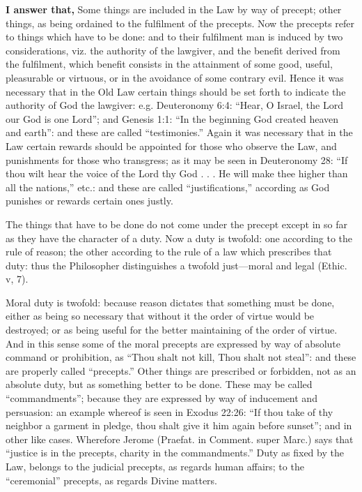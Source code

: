 \textbf{I answer that,} Some things are included in the Law by way of precept; other things, as being ordained to the fulfilment of the precepts. Now the precepts refer to things which have to be done: and to their fulfilment man is induced by two considerations, viz. the authority of the lawgiver, and the benefit derived from the fulfilment, which benefit consists in the attainment of some good, useful, pleasurable or virtuous, or in the avoidance of some contrary evil. Hence it was necessary that in the Old Law certain things should be set forth to indicate the authority of God the lawgiver: e.g. Deuteronomy 6:4: ``Hear, O Israel, the Lord our God is one Lord''; and Genesis 1:1: ``In the beginning God created heaven and earth'': and these are called ``testimonies.'' Again it was necessary that in the Law certain rewards should be appointed for those who observe the Law, and punishments for those who transgress; as it may be seen in Deuteronomy 28: ``If thou wilt hear the voice of the Lord thy God . . . He will make thee higher than all the nations,'' etc.: and these are called ``justifications,'' according as God punishes or rewards certain ones justly.

The things that have to be done do not come under the precept except in so far as they have the character of a duty. Now a duty is twofold: one according to the rule of reason; the other according to the rule of a law which prescribes that duty: thus the Philosopher distinguishes a twofold just—moral and legal (Ethic. v, 7).

Moral duty is twofold: because reason dictates that something must be done, either as being so necessary that without it the order of virtue would be destroyed; or as being useful for the better maintaining of the order of virtue. And in this sense some of the moral precepts are expressed by way of absolute command or prohibition, as ``Thou shalt not kill, Thou shalt not steal'': and these are properly called ``precepts.'' Other things are prescribed or forbidden, not as an absolute duty, but as something better to be done. These may be called ``commandments''; because they are expressed by way of inducement and persuasion: an example whereof is seen in Exodus 22:26: ``If thou take of thy neighbor a garment in pledge, thou shalt give it him again before sunset''; and in other like cases. Wherefore Jerome (Praefat. in Comment. super Marc.) says that ``justice is in the precepts, charity in the commandments.'' Duty as fixed by the Law, belongs to the judicial precepts, as regards human affairs; to the ``ceremonial'' precepts, as regards Divine matters.

